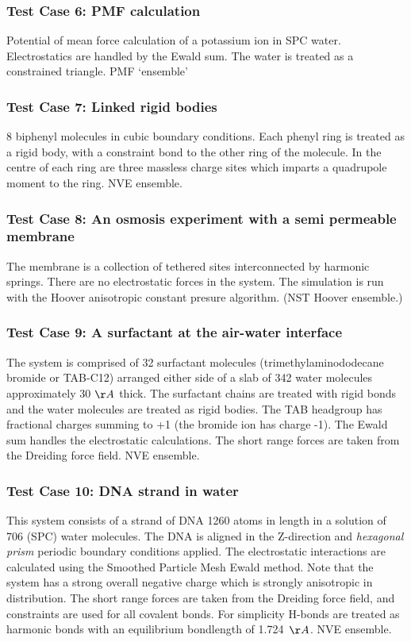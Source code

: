 \subsubsection{Test Case 6: PMF calculation}
Potential of mean force calculation of a potassium ion in SPC
water. Electrostatics are handled by the Ewald sum. The water is
treated as a constrained triangle. PMF `ensemble'

\subsubsection{Test Case 7: Linked rigid bodies}
8 biphenyl molecules in cubic boundary conditions.  Each phenyl ring is
treated as a rigid body, with a constraint bond to the other ring of the
molecule. In the centre of each ring are three massless charge sites which
imparts a quadrupole moment to the ring. NVE ensemble.

\subsubsection{Test Case 8: An osmosis experiment with a semi permeable membrane}
The membrane is a collection of tethered sites interconnected by harmonic
springs.  There are no electrostatic forces in the system. The simulation is
run with the Hoover anisotropic constant presure algorithm. (NST Hoover
ensemble.)

\subsubsection{Test Case 9: A surfactant at the air-water interface}
The system is comprised of 32 surfactant molecules (trimethylaminododecane
bromide or TAB-C12) arranged either side of a slab of 342 water molecules
approximately 30 $\AA$ thick. The surfactant chains are treated with rigid
bonds and the water molecules are treated as rigid bodies. The TAB headgroup
has fractional charges summing to +1 (the bromide ion has charge -1). The
Ewald sum handles the electrostatic calculations. The short range forces are
taken from the Dreiding force field.  NVE ensemble.

\subsubsection{Test Case 10: DNA strand in water}
This system consists of a strand of DNA 1260 atoms in length in a solution of
706 (SPC) water molecules. The DNA is aligned in the Z-direction and {\em
hexagonal prism} periodic boundary conditions applied. The electrostatic
interactions are calculated using the Smoothed Particle Mesh Ewald
method. Note that the system has a strong overall negative charge which is
strongly anisotropic in distribution.  The short range forces are taken from
the Dreiding force field, and constraints are used for all covalent bonds. For
simplicity H-bonds are treated as harmonic bonds with an equilibrium
bondlength of 1.724~$\AA$. NVE ensemble.

